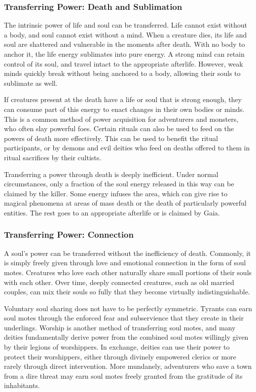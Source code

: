     \subsubsection{Transferring Power: Death and Sublimation}
      The intrinsic power of life and soul can be transferred.
      Life cannot exist without a body, and soul cannot exist without a mind.
      When a creature dies, its life and soul are shattered and vulnerable in the moments after death.
      With no body to anchor it, the life energy sublimates into pure energy.
      A strong mind can retain control of its soul, and travel intact to the appropriate afterlife.
      However, weak minds quickly break without being anchored to a body, allowing their souls to sublimate as well.

      If creatures present at the death have a life or soul that is strong enough, they can consume part of this energy to enact changes in their own bodies or minds.
      This is a common method of power acquisition for adventurers and monsters, who often slay powerful foes.
      Certain rituals can also be used to feed on the powers of death more effectively.
      This can be used to benefit the ritual participants, or by demons and evil deities who feed on deaths offered to them in ritual sacrifices by their cultists.

      Transferring a power through death is deeply inefficient.
      Under normal circumstances, only a fraction of the soul energy released in this way can be claimed by the killer.
      Some energy infuses the area, which can give rise to magical phenomena at areas of mass death or the death of particularly powerful entities.
      The rest goes to an appropriate afterlife or is claimed by Gaia.

    \subsubsection{Transferring Power: Connection}
      A soul's power can be transferred without the inefficiency of death.
      Commonly, it is simply freely given through love and emotional connection in the form of soul motes.
      Creatures who love each other naturally share small portions of their souls with each other.
      Over time, deeply connected creatures, such as old married couples, can mix their souls so fully that they become virtually indistinguishable.

      Voluntary soul sharing does not have to be perfectly symmetric.
      Tyrants can earn soul motes through the enforced fear and subservience that they create in their underlings.
      Worship is another method of transferring soul motes, and many deities fundamentally derive power from the combined soul motes willingly given by their legions of worshippers.
      In exchange, deities can use their power to protect their worshippers, either through divinely empowered clerics or more rarely through direct intervention.
      More mundanely, adventurers who save a town from a dire threat may earn soul motes freely granted from the gratitude of its inhabitants.

